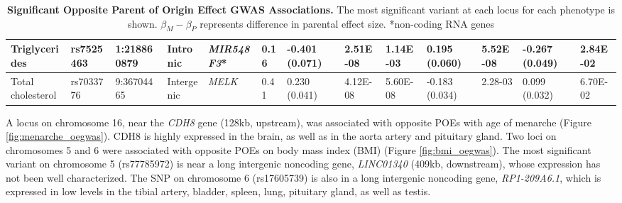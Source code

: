 \begin{table}
\begin{adjustbox}{width={\textwidth}}
\begin{tabular}{@{}p{3cm}|p{1.8cm}p{2cm}p{2cm}p{2cm}p{0.8cm}p{1.8cm}p{2.5cm}|p{1.8cm}p{1.8cm}|p{1.8cm}p{1.8cm}|p{1.8cm}@{}}
Triglycerides & rs7525463 & 1:218860879 & Intronic & \emph{MIR548F3}* & 0.16 & -0.401 (0.071) & 2.51E-08 & 1.14E-03 & 0.195 (0.060)  & 5.52E-08 & -0.267 (0.049)	& 2.84E-02\\ \hline
Total cholesterol & rs7033776 & 9:36704465 & Intergenic & \emph{MELK} & 0.41 & 0.230 (0.041) & 4.12E-08 & 5.60E-08	& -0.183 (0.034) & 2.28-03 & 0.099 (0.032) & 6.70E-02\\ \hline
\bottomrule
\end{tabular}
\end{adjustbox}
\caption[Significant Opposite Parent of Origin Effect GWAS Associations.]{\textbf{Significant Opposite Parent of Origin Effect GWAS Associations.} The most significant variant at each locus for each phenotype is shown.  $\beta_{M}-\beta_{P}$ represents difference in parental effect size.
*non-coding RNA genes
}
\label{tab:oppparent}
\end{table}




A locus on chromosome 16, near the \emph{CDH8} gene (128kb, upstream), was associated with opposite POEs with age of menarche (Figure \ref{fig:menarche_oegwas}). CDH8 is highly expressed in the brain, as well as in the aorta artery and pituitary gland. Two loci on chromosomes 5 and 6 were associated with opposite POEs on body mass index (BMI) (Figure \ref{fig:bmi_oegwas}). The most significant variant on chromosome 5 (rs77785972) is near a long intergenic noncoding gene, \emph{LINC01340} (409kb, downstream), whose expression has not been well characterized. The SNP on chromosome 6 (rs17605739) is also in a long intergenic noncoding gene, \emph{RP1-209A6.1}, which is expressed in low levels in the tibial artery, bladder, spleen, lung, pituitary gland, as well as testis. 


